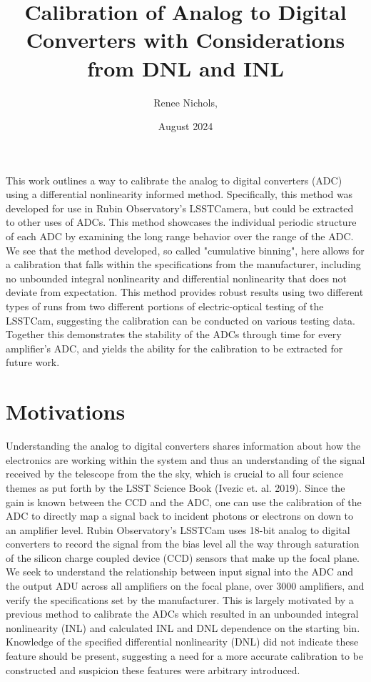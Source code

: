 \documentclass[11pt, letterpaper]{article}
\title{Calibration of Analog to Digital Converters with Considerations from DNL and INL}
\author{Renee Nichols, }
\date{August 2024}
\begin{document}
\maketitle 

This work outlines a way to calibrate the analog to digital converters (ADC) using a differential nonlinearity informed method. 
Specifically, this method was developed for use in Rubin Observatory's LSSTCamera, but could be extracted to other uses of ADCs. 
This method showcases the individual periodic structure of each ADC by examining the long range behavior over the range of the ADC. 
We see that the method developed, so called "cumulative binning", here allows for a calibration that falls within the specifications from the manufacturer, including no unbounded integral nonlinearity and differential nonlinearity that does not deviate from expectation. 
This method provides robust results using two different types of runs from two different portions of electric-optical testing of the LSSTCam, suggesting the calibration can be conducted on various testing data.
Together this demonstrates the stability of the ADCs through time for every amplifier's ADC, and yields the ability for the calibration to be extracted for future work.

\section{Motivations}
\indent

 
Understanding the analog to digital converters shares information about how the electronics are working within the system and thus an understanding of the signal received by the telescope from the the sky, which is crucial to all four science themes as put forth by the LSST Science Book (Ivezic et. al. 2019). 
Since the gain is known between the CCD and the ADC, one can use the calibration of the ADC to directly map a signal back to incident photons or electrons on down to an amplifier level.
Rubin Observatory’s LSSTCam uses 18-bit analog to digital converters to record the signal from the bias level all the way through saturation of the silicon charge coupled device (CCD) sensors that make up the focal plane. 
We seek to understand the relationship between input signal into the ADC and the output ADU across all amplifiers on the focal plane, over 3000 amplifiers, and verify the specifications set by the manufacturer. 
This is largely motivated by a previous method to calibrate the ADCs which resulted in an unbounded integral nonlinearity (INL) and calculated INL and DNL dependence on the starting bin.
Knowledge of the specified differential nonlinearity (DNL) did not indicate these feature should be present, suggesting a need for a more accurate calibration to be constructed and suspicion these features were arbitrary introduced. 
\end{document}
